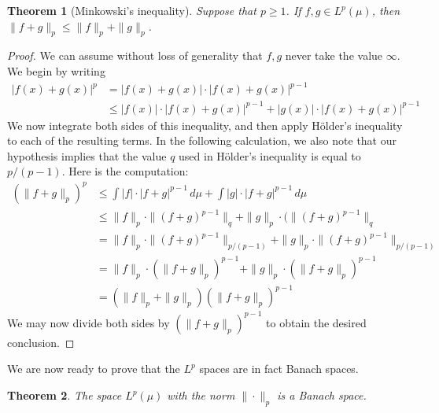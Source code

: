 \documentclass[11pt,oneside]{amsbook}
\theoremstyle{definition}
\theoremstyle{plain}
\newtheorem{thm}{Theorem}[section]
\theoremstyle{definition}
\theoremstyle{remark}
\numberwithin{equation}{section}
\numberwithin{figure}{section}
\begin{document}
\begin{thm}[Minkowski's inequality]
  Suppose that $p\geq1$. If $f,g\in L^p(\mu)$, then $\|f+g\|_p\leq\|f\|_p+\|g\|_p$.
\end{thm}

\begin{proof}
  We can assume without loss of generality that $f,g$ never take the value $\infty$. We begin by writing
  \begin{align*}
    |f(x)+g(x)|^p&=|f(x)+g(x)|\cdot|f(x)+g(x)|^{p-1}\\
                 &\leq|f(x)|\cdot|f(x)+g(x)|^{p-1}
                   +|g(x)|\cdot|f(x)+g(x)|^{p-1}
  \end{align*}
  We now integrate both sides of this inequality, and then apply H\"older's inequality to each of the resulting terms. In the following calculation, we also note that our hypothesis implies that the value $q$ used in H\"older's inequality is equal to $p/(p-1)$. Here is the computation:
  \begin{align*}
    (\|f+g\|_p)^p&\leq\int|f|\cdot|f+g|^{p-1}\,d\mu
                   +\int|g|\cdot|f+g|^{p-1}\,d\mu\\
                 &\leq\|f\|_p\cdot\|(f+g)^{p-1}\|_q
                   +\|g\|_p\cdot(\|(f+g)^{p-1}\|_q\\
                 &=\|f\|_p\cdot\|(f+g)^{p-1}\|_{p/(p-1)}
                   +\|g\|_p\cdot\|(f+g)^{p-1}\|_{p/(p-1)}\\
                 &=\|f\|_p\cdot(\|f+g\|_p)^{p-1}
                   +\|g\|_p\cdot(\|f+g\|_p)^{p-1}\\
                 &=(\|f\|_p+\|g\|_p)(\|f+g\|_p)^{p-1}
  \end{align*}
  We may now divide both sides by $(\|f+g\|_p)^{p-1}$ to obtain the desired conclusion.
\end{proof}

We are now ready to prove that the $L^p$ spaces are in fact Banach spaces.

\begin{thm}
  The space $L^p(\mu)$ with the norm $\|\cdot\|_p$ is a Banach space.
\end{thm}
\end{document}
